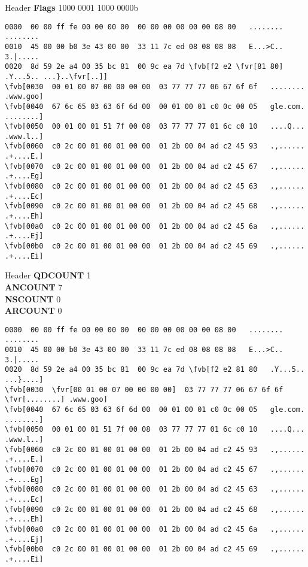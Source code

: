 \documentclass{beamer}
\newcommand*{\fvr}[1]{\textcolor{red}{#1}}
\newcommand*{\fvb}[1]{\textcolor{blue}{#1}}
\begin{document}
  \begin{frame}[fragile]{\mytitle}{Header}
    \textbf{Flags} 1000 0001 1000 0000b
    \vfill
    \tiny
    \begin{Verbatim}[commandchars=\\\[\]]
0000  00 00 ff fe 00 00 00 00  00 00 00 00 00 00 08 00   ........ ........
0010  45 00 00 b0 3e 43 00 00  33 11 7c ed 08 08 08 08   E...>C.. 3.|.....
0020  8d 59 2e a4 00 35 bc 81  00 9c ea 7d \fvb[f2 e2 \fvr[81 80]   .Y...5.. ...}..\fvr[..]]
\fvb[0030  00 01 00 07 00 00 00 00  03 77 77 77 06 67 6f 6f   ........ .www.goo]
\fvb[0040  67 6c 65 03 63 6f 6d 00  00 01 00 01 c0 0c 00 05   gle.com. ........]
\fvb[0050  00 01 00 01 51 7f 00 08  03 77 77 77 01 6c c0 10   ....Q... .www.l..]
\fvb[0060  c0 2c 00 01 00 01 00 00  01 2b 00 04 ad c2 45 93   .,...... .+....E.]
\fvb[0070  c0 2c 00 01 00 01 00 00  01 2b 00 04 ad c2 45 67   .,...... .+....Eg]
\fvb[0080  c0 2c 00 01 00 01 00 00  01 2b 00 04 ad c2 45 63   .,...... .+....Ec]
\fvb[0090  c0 2c 00 01 00 01 00 00  01 2b 00 04 ad c2 45 68   .,...... .+....Eh]
\fvb[00a0  c0 2c 00 01 00 01 00 00  01 2b 00 04 ad c2 45 6a   .,...... .+....Ej]
\fvb[00b0  c0 2c 00 01 00 01 00 00  01 2b 00 04 ad c2 45 69   .,...... .+....Ei]
    \end{Verbatim}
\end{frame}

  \begin{frame}[fragile]{\mytitle}{Header}
    \textbf{QDCOUNT} 1\\
    \textbf{ANCOUNT} 7\\
    \textbf{NSCOUNT} 0\\
    \textbf{ARCOUNT} 0\\
    \vfill
    \tiny
    \begin{Verbatim}[commandchars=\\\[\]]
0000  00 00 ff fe 00 00 00 00  00 00 00 00 00 00 08 00   ........ ........
0010  45 00 00 b0 3e 43 00 00  33 11 7c ed 08 08 08 08   E...>C.. 3.|.....
0020  8d 59 2e a4 00 35 bc 81  00 9c ea 7d \fvb[f2 e2 81 80   .Y...5.. ...}....]
\fvb[0030  \fvr[00 01 00 07 00 00 00 00]  03 77 77 77 06 67 6f 6f   \fvr[........] .www.goo]
\fvb[0040  67 6c 65 03 63 6f 6d 00  00 01 00 01 c0 0c 00 05   gle.com. ........]
\fvb[0050  00 01 00 01 51 7f 00 08  03 77 77 77 01 6c c0 10   ....Q... .www.l..]
\fvb[0060  c0 2c 00 01 00 01 00 00  01 2b 00 04 ad c2 45 93   .,...... .+....E.]
\fvb[0070  c0 2c 00 01 00 01 00 00  01 2b 00 04 ad c2 45 67   .,...... .+....Eg]
\fvb[0080  c0 2c 00 01 00 01 00 00  01 2b 00 04 ad c2 45 63   .,...... .+....Ec]
\fvb[0090  c0 2c 00 01 00 01 00 00  01 2b 00 04 ad c2 45 68   .,...... .+....Eh]
\fvb[00a0  c0 2c 00 01 00 01 00 00  01 2b 00 04 ad c2 45 6a   .,...... .+....Ej]
\fvb[00b0  c0 2c 00 01 00 01 00 00  01 2b 00 04 ad c2 45 69   .,...... .+....Ei]
    \end{Verbatim}
\end{frame}
\end{document}
